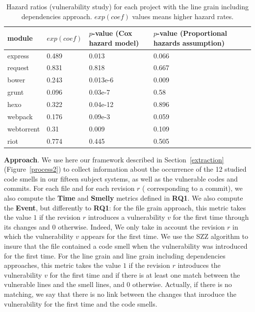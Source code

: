 {\begin{table}[t]
\end{table}

\begin{table}[t]
	\centering
	\scriptsize
	\caption{Hazard ratios (vulnerability study) for each project with the line grain including dependencies approach. $exp(coef)$ values means higher hazard rates.}
	\label{vulnlinegraindep}
	\begin{tabular}{l|l|l|m{4cm}}
		\hline
		module & $exp(coef)$ & $p$-value (Cox hazard model) & $p$-value (Proportional hazards assumption)     \\ \hline
		express  & 0.489 & 0.013 & 0.066 \\ \hline
		request  & 0.831 & 0.818 & 0.667 \\ \hline
		bower	 & 0.243 & 0.013e-6 & 0.009 \\ \hline
		grunt    & 0.096 & 0.03e-7 & 0.58 \\ \hline
		hexo	 & 0.322 & 0.04e-12 & 0.896 \\ \hline
		webpack	 & 0.176 & 0.09e-3 & 0.059 \\ \hline
		webtorrent & 0.31 & 0.009 & 0.109 \\ \hline
		riot	 & 0.774 & 0.445 & 0.505 \\ \hline
	\end{tabular}

\end{table}

\textbf{Approach}. We use here our framework described in Section~\ref{extraction} {\color{blue}(Figure~\ref{process2})} to collect information about the occurrence of the 12 studied code smells in our {\color{blue}fifteen} subject systems, as well as the vulnerable codes and commits.
For each file and for each revision $r$ (\ie{} corresponding to a commit), we also compute the \textbf{Time} and \textbf{Smelly} metrics defined in \textbf{RQ1}. We also compute the \textbf{Event}, but differently to \textbf{RQ1}: for the file grain approach, this metric takes the value $1$ if the revision $r$ introduces a vulnerability $v$ for the first time through its changes and $0$ otherwise. Indeed, We only take in account the revision $r$ in which the vulnerability $v$ appears for the first time. We use the SZZ algorithm to insure that the file contained a code smell when the vulnerability was introduced for the first time. For the line grain and line grain including dependencies approaches, this metric takes the value $1$ if the revision $r$ introduces the vulnerability $v$ for the first time and if there is at least one match between the vulnerable lines and the smell lines, and $0$ otherwise. Actually, if there is no matching, we say that there is no link between the changes that inroduce the vulnerability for the first time and the code smells.

}
